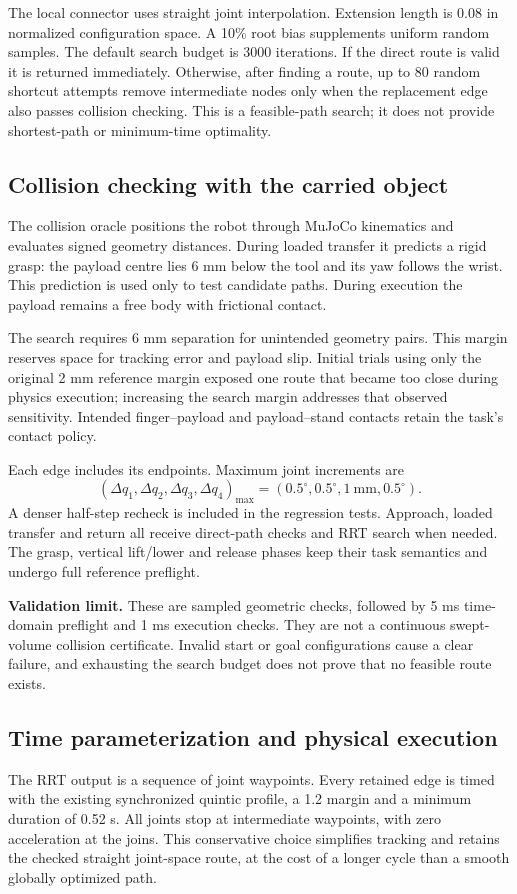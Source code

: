 \documentclass[11pt,a4paper]{article}
\begin{document}
The local connector uses straight joint interpolation. Extension length is
0.08 in normalized configuration space. A 10\% root bias supplements
uniform random samples. The default search budget is 3000 iterations. If
the direct route is valid it is returned immediately. Otherwise, after
finding a route, up to 80 random shortcut attempts remove intermediate
nodes only when the replacement edge also passes collision checking.
This is a feasible-path search; it does not provide shortest-path or
minimum-time optimality.

\subsection{Collision checking with the carried object}
The collision oracle positions the robot through MuJoCo kinematics and
evaluates signed geometry distances. During loaded transfer it predicts a
rigid grasp: the payload centre lies 6 mm below the tool and its yaw follows
the wrist. This prediction is used only to test candidate paths. During
execution the payload remains a free body with frictional contact.

The search requires 6 mm separation for unintended geometry pairs. This
margin reserves space for tracking error and payload slip. Initial trials
using only the original 2 mm reference margin exposed one route that became
too close during physics execution; increasing the search margin addresses
that observed sensitivity. Intended finger--payload and payload--stand
contacts retain the task's contact policy.

Each edge includes its endpoints. Maximum joint increments are
\begin{equation}
 (\Delta q_1,\Delta q_2,\Delta q_3,\Delta q_4)_{\max}
 =(0.5^\circ,0.5^\circ,1\ \mathrm{mm},0.5^\circ).
\end{equation}
A denser
half-step recheck is included in the regression tests. Approach, loaded
transfer and return all receive direct-path checks and RRT search when
needed. The grasp, vertical lift/lower and release phases keep their task
semantics and undergo full reference preflight.

\textbf{Validation limit.} These are sampled geometric checks, followed by
5 ms time-domain preflight and 1 ms execution checks. They are not a
continuous swept-volume collision certificate. Invalid start or goal
configurations cause a clear failure, and exhausting the search budget does
not prove that no feasible route exists.

\subsection{Time parameterization and physical execution}
The RRT output is a sequence of joint waypoints. Every retained edge is
timed with the existing synchronized quintic profile, a 1.2 margin and a
minimum duration of 0.52 s. All joints stop at intermediate waypoints,
with zero acceleration at the joins. This conservative choice simplifies
tracking and retains the checked straight joint-space route, at the cost
of a longer cycle than a smooth globally optimized path.
\end{document}

